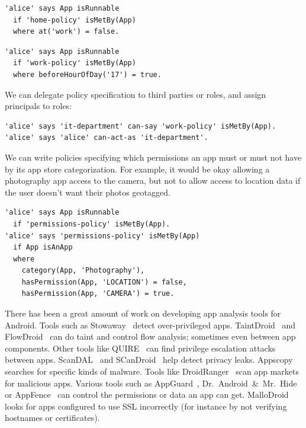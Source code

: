 \documentclass[]{llncs}
\newcommand{\citep}[1]{\cite{#1}}
\begin{document}
\noindent
\begin{minipage}{\linewidth}
  \begin{minipage}{0.5\linewidth}
    \begin{lstlisting}
'alice' says App isRunnable
  if 'home-policy' isMetBy(App)
  where at('work') = false.
    \end{lstlisting}
  \end{minipage}
  \begin{minipage}{0.5\linewidth}
    \begin{lstlisting}
'alice' says App isRunnable
  if 'work-policy' isMetBy(App)
  where beforeHourOfDay('17') = true.
    \end{lstlisting}
  \end{minipage}
\end{minipage}
\noindent We can delegate policy specification to third parties or roles, and assign principals to roles:
\begin{lstlisting}
'alice' says 'it-department' can-say 'work-policy' isMetBy(App).
'alice' says 'alice' can-act-as 'it-department'.
\end{lstlisting}
We can write policies specifying which permissions an app must or must not have by its app store categorization.
For example, it would be okay allowing a photography app access to the camera, but not to allow access to location data if the user doesn't want their photos geotagged.
\begin{lstlisting}
'alice' says App isRunnable
  if 'permissions-policy' isMetBy(App).
'alice' says 'permissions-policy' isMetBy(App)
  if App isAnApp
  where
    category(App, 'Photography'),
    hasPermission(App, 'LOCATION') = false,
    hasPermission(App, 'CAMERA') = true.
\end{lstlisting}

There has been a great amount of work on developing app analysis tools for Android.
Tools such as Stowaway~\cite{Felt:2011kj} detect over-privileged apps.
TaintDroid~\cite{Enck:2010uw} and FlowDroid~\cite{Arzt:2014kf,Li:2015wo} can do taint and control flow analysis; sometimes even between app components.
Other tools like QUIRE~\cite{Bugiel:2012ui} can find privilege escalation attacks between apps.
ScanDAL~\cite{Kim:2012vt} and SCanDroid~\cite{Fuchs:2009vi} help detect privacy leaks.
Appscopy~\cite{Feng:kPGZr_ja} searches for specific kinds of malware.
Tools like DroidRanger~\cite{Zhou:2012tb} scan app markets for malicious apps.
Various tools such as AppGuard~\cite{Backes:2012vm}, Dr.~Android~\&~Mr.~Hide~\cite{Jeon:2012ki} or AppFence~\cite{Hornyack:2011wq} can control the permissions or data an app can get.
MalloDroid~\citep{Fahl:2012dj} looks for apps configured to use SSL incorrectly (for instance by not verifying hostnames or certificates).
\end{document}
